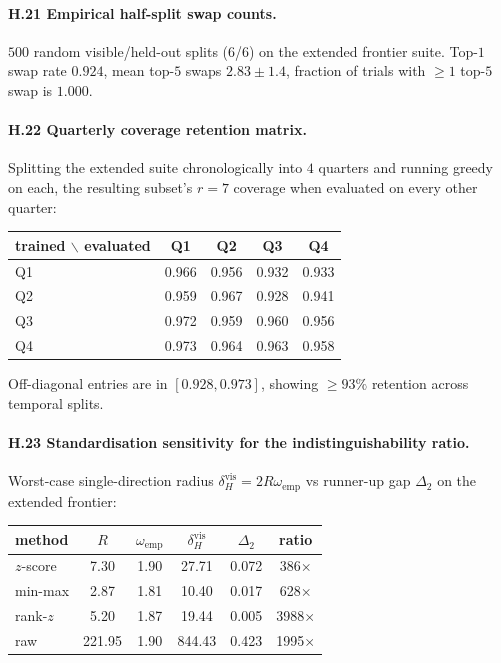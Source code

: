 \documentclass{article}
\begin{document}
\paragraph{H.21 Empirical half-split swap counts.}
$500$ random visible/held-out splits ($6$/$6$) on the extended
frontier suite. Top-$1$ swap rate $0.924$, mean top-$5$ swaps $2.83
\pm 1.4$, fraction of trials with $\ge 1$ top-$5$ swap is $1.000$.

\paragraph{H.22 Quarterly coverage retention matrix.}
Splitting the extended suite chronologically into $4$ quarters and
running greedy on each, the resulting subset's $r=7$ coverage when
evaluated on every other quarter:
\begin{center}\small
\begin{tabular}{lcccc}
\toprule
trained $\backslash$ evaluated & Q1 & Q2 & Q3 & Q4 \\
\midrule
Q1 & 0.966 & 0.956 & 0.932 & 0.933 \\
Q2 & 0.959 & 0.967 & 0.928 & 0.941 \\
Q3 & 0.972 & 0.959 & 0.960 & 0.956 \\
Q4 & 0.973 & 0.964 & 0.963 & 0.958 \\
\bottomrule
\end{tabular}
\end{center}
Off-diagonal entries are in $[0.928, 0.973]$, showing $\ge 93\%$
retention across temporal splits.

\paragraph{H.23 Standardisation sensitivity for the indistinguishability
ratio.}
Worst-case single-direction radius $\delta_H^{\mathrm{vis}} = 2 R
\omega_{\mathrm{emp}}$ vs runner-up gap $\Delta_2$ on the extended
frontier:
\begin{center}\small
\begin{tabular}{lccccc}
\toprule
method & $R$ & $\omega_{\mathrm{emp}}$ & $\delta_H^{\mathrm{vis}}$ &
$\Delta_2$ & ratio \\
\midrule
$z$-score    &   7.30 & 1.90 &  27.71 & 0.072 &  386$\times$ \\
min-max      &   2.87 & 1.81 &  10.40 & 0.017 &  628$\times$ \\
rank-$z$     &   5.20 & 1.87 &  19.44 & 0.005 & 3988$\times$ \\
raw          & 221.95 & 1.90 & 844.43 & 0.423 & 1995$\times$ \\
\bottomrule
\end{tabular}
\end{center}
\end{document}
